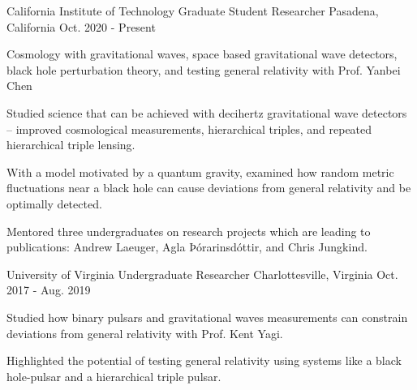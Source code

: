 

\begin{cventries}

  \cventry
    {California Institute of Technology } %
    {Graduate Student Researcher} %
    {Pasadena, California} %
    {Oct. 2020 - Present} %
    {
      \begin{cvitems} %
        \item{Cosmology with gravitational waves, space based gravitational wave detectors, black hole perturbation theory, and testing general relativity with Prof. Yanbei Chen}
        \item{Studied science that can be achieved with decihertz gravitational wave detectors -- improved cosmological measurements, hierarchical triples, and repeated hierarchical triple lensing.}
        \item{With a model motivated by a quantum gravity, examined how random metric fluctuations near a black hole can cause deviations from general relativity and be optimally detected.}
        \item{Mentored three undergraduates on research projects which are leading to publications: Andrew Laeuger, Agla Þórarinsdóttir, and Chris Jungkind. }
      \end{cvitems}
    }

  \cventry
    {University of Virginia} %
    {Undergraduate Researcher} %
    {Charlottesville, Virginia} %
    {Oct. 2017 - Aug. 2019} %
    {
      \begin{cvitems} %
        \item{Studied how binary pulsars and gravitational waves measurements can constrain deviations from general relativity with Prof. Kent Yagi.}
        \item{Highlighted the potential of testing general relativity using systems like a black hole-pulsar and a hierarchical triple pulsar. }
      \end{cvitems}
    }


\end{cventries}

